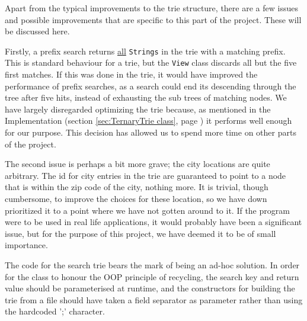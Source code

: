 Apart from the typical improvements to the trie structure, there are a few issues and possible improvements that are specific to this part of the project. These will be discussed here.

Firstly, a prefix search returns \underline{all} \texttt{Strings} in the trie with a matching prefix.
This is standard behaviour for a trie, but the \texttt{View} class discards all but the five first matches. If this was done in the trie, it would have improved the performance of prefix searches, as a search could end its descending through the tree after five hits, instead of exhausting the sub trees of matching nodes. We have largely disregarded optimizing the trie because, as mentioned in the Implementation (section \ref{sec:TernaryTrie class}, page \pageref{sec:TernaryTrie class}) it performs well enough for our purpose. This decision has allowed us to spend more time on other parts of the project.

The second issue is perhaps a bit more grave; the city locations are quite arbitrary.
The id for city entries in the trie are guaranteed to point to a node that is within the zip code of the city, nothing more. It is trivial, though cumbersome, to improve the choices for these location, so we have down prioritized it to a point where we have not gotten around to it.
If the program were to be used in real life applications, it would probably have been a significant issue, but for the purpose of this project, we have deemed it to be of small importance.

The code for the search trie bears the mark of being an ad-hoc solution. In order for the class to honour the OOP principle of recycling, the search key and return value should be parameterised at runtime, and the constructors for building the trie from a file should have taken a field separator as parameter rather than using the hardcoded ';' character.
